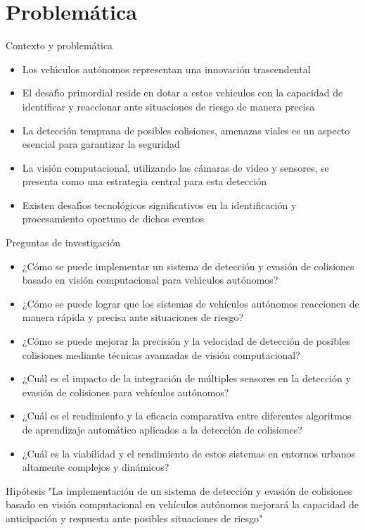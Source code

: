 \documentclass[8pt]{beamer}
\begin{document}
    \section{Problemática}
    \begin{frame}{Contexto y problemática}
        \begin{itemize}
            \item Los vehı́culos autónomos representan una innovación trascendental
            \item El desafı́o primordial reside en dotar a estos vehı́culos con la capacidad de identificar y reaccionar ante situaciones de riesgo de manera precisa
            \item La detección temprana de posibles colisiones, amenazas viales es un aspecto esencial para garantizar la seguridad
            \item La visión computacional, utilizando las cámaras de video y sensores, se presenta como una estrategia central para esta detección
            \item Existen desafı́os tecnológicos significativos en la identificación y procesamiento oportuno de dichos eventos
        \end{itemize}
    \end{frame}
    \begin{frame}{Preguntas de investigación}
        \begin{itemize}
            \item ¿Cómo se puede implementar un sistema de detección y evasión de colisiones basado en visión computacional para vehı́culos autónomos?
            \item ¿Cómo se puede lograr que los sistemas de vehículos autónomos reaccionen de manera rápida y precisa ante situaciones de riesgo?
            \item ¿Cómo se puede mejorar la precisión y la velocidad de detección de posibles colisiones mediante técnicas avanzadas de visión computacional?
            \item ¿Cuál es el impacto de la integración de múltiples sensores en la detección y evasión de colisiones para vehículos autónomos?
            \item ¿Cuál es el rendimiento y la eficacia comparativa entre diferentes algoritmos de aprendizaje automático aplicados a la detección de colisiones?
            \item ¿Cuál es la viabilidad y el rendimiento de estos sistemas en entornos urbanos altamente complejos y dinámicos?
        \end{itemize}
    \end{frame}
    \begin{frame}{Hipótesis}
        "La implementación de un sistema de detección y evasión de colisiones basado en visión computacional en vehículos autónomos
        mejorará la capacidad de anticipación y respuesta ante posibles situaciones de riesgo"
    \end{frame}
    
\end{document}
